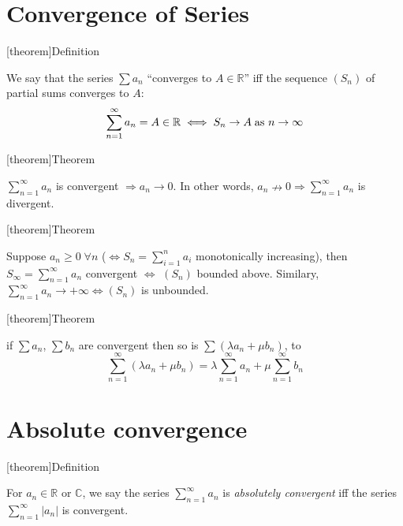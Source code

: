 \documentclass[12pt]{report}
\theoremstyle{definition}
\begin{document}
\section{Convergence of Series}
[theorem]{Definition}
\begin{convergent series}
    We say that the series $\sum a_n$ ``converges to $A \in \mathbb{R}$'' iff the sequence $(S_n)$ of partial sums
    converges to $A$:\[
        \sum_{n=1}^{\infty} a_n = A \in \mathbb{R} \iff S_n \rightarrow A \;\textnormal{as $n \rightarrow\infty$}
    \]
\end{convergent series}

[theorem]{Theorem}
\begin{convergent series' term tends to 0}
    $\sum_{n=1}^{\infty} a_n$ is convergent $\Rightarrow a_n \rightarrow 0$. In other words, 
    $a_n \nrightarrow 0 \Rightarrow \sum_{n=1}^{\infty} a_n$ is divergent.
\end{convergent series' term tends to 0}

[theorem]{Theorem}
\begin{determine convergent series}
    Suppose $a_n \ge 0 \; \forall n$ ($\iff S_n = \sum_{i=1}^{n} a_i$ monotonically increasing), 
    then $S_\infty = \sum_{n=1}^{\infty} a_n$ convergent $\iff$ $(S_n)$ bounded above.
    Similary, $\sum_{n=1}^{\infty} a_n \rightarrow +\infty \iff (S_n)$ is unbounded.
\end{determine convergent series}

[theorem]{Theorem}
\begin{Algebra of limits for series}
    if $\sum a_n$, $\sum b_n$ are convergent then so is $\sum (\lambda a_n + \mu b_n)$, to\[
        \sum_{n=1}^{\infty} (\lambda a_n + \mu b_n) = \lambda \sum_{n=1}^{\infty} a_n + \mu \sum_{n=1}^{\infty} b_n
    \]
\end{Algebra of limits for series}

\section{Absolute convergence}
[theorem]{Definition}
\begin{absolutely convergent}
    For $a_n \in \mathbb{R}$ or $\mathbb{C}$, we say the series $\sum_{n=1}^{\infty} a_n$ is \emph{absolutely convergent}
    iff the series $\sum_{n=1}^{\infty} |a_n|$ is convergent.
\end{absolutely convergent}
\end{document}
